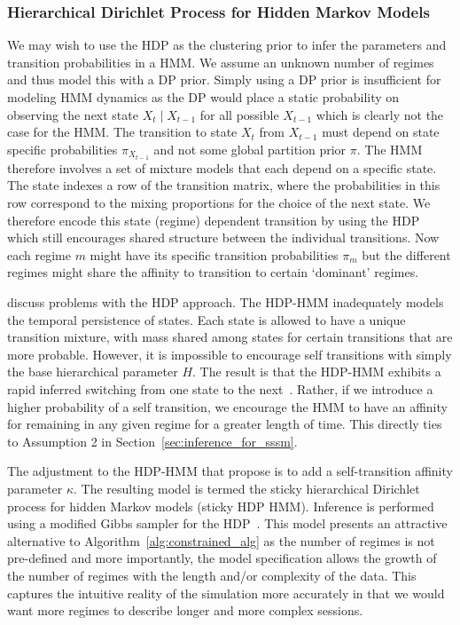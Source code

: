 \subsubsection{Hierarchical Dirichlet Process for Hidden Markov Models}
We may wish to use the HDP as the clustering prior to infer the parameters and transition probabilities in a HMM. We assume an unknown number of regimes and thus model this with a DP prior. Simply using a DP prior is insufficient for modeling HMM dynamics as the DP would place a static probability on observing the next state $X_t \mid X_{t-1}$ for all possible $X_{t-1}$ which is clearly not the case for the HMM. The transition to state $X_t$ from $X_{t-1}$ must depend on state specific probabilities $\pi_{X_{t-1}}$ and not some global partition prior $\pi$. The HMM therefore involves a set of mixture models that each depend on a specific state. The state indexes a row of the transition matrix, where the probabilities in this row correspond to the mixing proportions for the choice of the next state. We therefore encode this state (regime) dependent transition by using the HDP which still encourages shared structure between the individual transitions. Now each regime $m$ might have its specific transition probabilities $\pi_m$ but the different regimes might share the affinity to transition to certain `dominant' regimes.

\cite{fox2009nonparametric, fox2007hierarchical} discuss problems with the HDP approach. The HDP-HMM inadequately models the temporal persistence of states. Each state is allowed to have a unique transition mixture, with mass shared among states for certain transitions that are more probable. However, it is impossible to encourage self transitions with simply the base hierarchical parameter $H$. The result is that the HDP-HMM exhibits a rapid inferred switching from one state to the next~\citep{fox2007hierarchical}. Rather, if we introduce a higher probability of a self transition, we encourage the HMM to have an affinity for remaining in any given regime for a greater length of time. This directly ties to Assumption 2 in Section~\ref{sec:inference_for_sssm}.

The adjustment to the HDP-HMM that \cite{fox2009nonparametric,fox2007hierarchical} propose is to add a self-transition affinity parameter $\kappa$. The resulting model is termed the sticky hierarchical Dirichlet process for hidden Markov models (sticky HDP HMM). Inference is performed using a modified Gibbs sampler for the HDP~\citep{teh2005sharing}. This model presents an attractive alternative to Algorithm~\ref{alg:constrained_alg} as the number of regimes is not pre-defined and more importantly, the model specification allows the growth of the number of regimes with the length and/or complexity of the data. This captures the intuitive reality of the simulation more accurately in that we would want more regimes to describe longer and more complex sessions.

